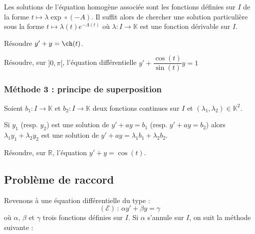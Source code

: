 \documentclass[french,11pt,twoside]{VcCours}
\begin{document}
Les solutions de l'équation homogène associée sont les fonctions définies sur $I$ de la forme $t \mapsto \lambda \exp \circ(-A)$. Il suffit alors de chercher une solution particulière sous la forme $t \mapsto \lambda(t) e^{-A(t)}$ où $\lambda : I \rightarrow \mathbb{K}$ est une fonction dérivable sur $I$.



\begin{Exemple} Résoudre $y'+y= \ch(t)$.

\newpage
\end{Exemple}

\begin{ApplicationDirecte}{}Résoudre, sur $]0,\pi[$, l'équation différentielle $y' + \dfrac{\cos(t)}{\sin(t)}y=1$
\end{ApplicationDirecte}



\subsubsection*{Méthode 3 : principe de superposition}

Soient $b_1 : I \rightarrow \mathbb{K}$ et $b_2 : I \rightarrow \mathbb{K}$ deux fonctions continues sur $I$ et $(\lambda_1, \lambda_2) \in \mathbb{K}^2$.

Si $y_1$ (resp. $y_2$) est une solution de $y'+ay=b_1$ (resp. $y'+ay=b_2$) alors $\lambda_1 y_1 + \lambda_2 y_2$ est une solution de $y'+ay=\lambda_1 b_1+ \lambda_2 b_2$.




\begin{Exemple} Résoudre, sur $\mathbb{R}$, l'équation $y'+y = \cos(t)$.

\vspace*{10cm}
\end{Exemple}


\subsection{Problème de raccord}
Revenons à une équation différentielle du type :
$$ (\mathcal{E}) \, : \, \alpha y'+\beta y= \gamma$$
où $\alpha$, $\beta$ et $\gamma$ trois fonctions définies sur $I$. Si $\alpha$ s'annule sur $I$, on suit la méthode suivante :
\end{document}
